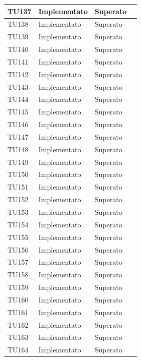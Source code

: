 \begin{longtable}{|>{\centering\arraybackslash}m{1.6cm}|>{\centering\arraybackslash}m{6.41cm}|>{\centering\arraybackslash}m{3.1cm}| c |}
	\rowcolor{LightGray}
	TU137 & Implementato & Superato  \\ \hline
	TU138 & Implementato & Superato  \\ \hline
	\rowcolor{LightGray}
	TU139 & Implementato & Superato  \\ \hline
	TU140 & Implementato & Superato  \\ \hline
	\rowcolor{LightGray}
	TU141 & Implementato & Superato  \\ \hline
	TU142 & Implementato & Superato  \\ \hline
	\rowcolor{LightGray}
	TU143 & Implementato & Superato  \\ \hline
	TU144 & Implementato & Superato  \\ \hline
	\rowcolor{LightGray}
	TU145 & Implementato & Superato  \\ \hline
	TU146 & Implementato & Superato  \\ \hline
	\rowcolor{LightGray}
	TU147 & Implementato & Superato  \\ \hline
	TU148 & Implementato & Superato  \\ \hline
	\rowcolor{LightGray}
	TU149 & Implementato & Superato  \\ \hline
	TU150 & Implementato & Superato  \\ \hline
	\rowcolor{LightGray}
	TU151 & Implementato & Superato  \\ \hline
	TU152 & Implementato & Superato  \\ \hline
	\rowcolor{LightGray}
	TU153 & Implementato & Superato  \\ \hline
	TU154 & Implementato & Superato  \\ \hline
	\rowcolor{LightGray}
	TU155 & Implementato & Superato  \\ \hline
	TU156 & Implementato & Superato  \\ \hline
	\rowcolor{LightGray}
	TU157 & Implementato & Superato  \\ \hline
	TU158 & Implementato & Superato  \\ \hline
	\rowcolor{LightGray}
	TU159 & Implementato & Superato  \\ \hline
	TU160 & Implementato & Superato  \\ \hline
	\rowcolor{LightGray}
	TU161 & Implementato & Superato  \\ \hline
	TU162 & Implementato & Superato  \\ \hline
	\rowcolor{LightGray}
	TU163 & Implementato & Superato  \\ \hline
	TU164 & Implementato & Superato  \\ \hline

\end{longtable}
